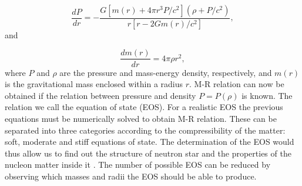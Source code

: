 \documentclass{wihuri}
\begin{document}
\begin{equation}
 \frac{dP}{dr} = -\frac{G[m(r)+4 \pi r^{3}P/c^{2}](\rho + P/c^{2})}{r[r-2Gm(r)/c^{2}]},
 \end{equation} 
and

\begin{equation}
 \frac{dm(r)}{dr} = 4 \pi \rho r^{2},
 \end{equation}
where $P$ and $\rho$ are the pressure and mass-energy density, respectively, and $m(r)$ is the gravitational mass enclosed within a radius $r$. M-R relation can now be obtained if the relation between pressure and density $P=P(\rho)$ is known. The relation we call the equation of state (EOS). For a realistic EOS the previous equations must be numerically solved to obtain M-R relation. These can be separated into three categories according to the compressibility of the matter: soft, moderate and stiff equations of state. The determination of the EOS would thus allow us to find out the structure of neutron star and the properties of the nucleon matter inside it \cite{akmal}. The number of possible EOS can be reduced by observing which masses and radii the EOS should be able to produce.




\end{document}
